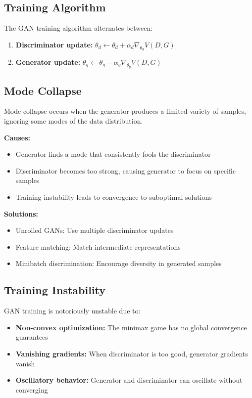 \subsection{Training Algorithm}

The GAN training algorithm alternates between:
\begin{enumerate}
    \item \textbf{Discriminator update:} $\theta_d \leftarrow \theta_d + \alpha_d \nabla_{\theta_d} V(D, G)$
    \item \textbf{Generator update:} $\theta_g \leftarrow \theta_g - \alpha_g \nabla_{\theta_g} V(D, G)$
\end{enumerate}

\subsection{Mode Collapse}

Mode collapse occurs when the generator produces a limited variety of samples, ignoring some modes of the data distribution.

\textbf{Causes:}
\begin{itemize}
    \item Generator finds a mode that consistently fools the discriminator
    \item Discriminator becomes too strong, causing generator to focus on specific samples
    \item Training instability leads to convergence to suboptimal solutions
\end{itemize}

\textbf{Solutions:}
\begin{itemize}
    \item Unrolled GANs: Use multiple discriminator updates
    \item Feature matching: Match intermediate representations
    \item Minibatch discrimination: Encourage diversity in generated samples
\end{itemize}

\subsection{Training Instability}

GAN training is notoriously unstable due to:
\begin{itemize}
    \item \textbf{Non-convex optimization:} The minimax game has no global convergence guarantees
    \item \textbf{Vanishing gradients:} When discriminator is too good, generator gradients vanish
    \item \textbf{Oscillatory behavior:} Generator and discriminator can oscillate without converging
\end{itemize}

